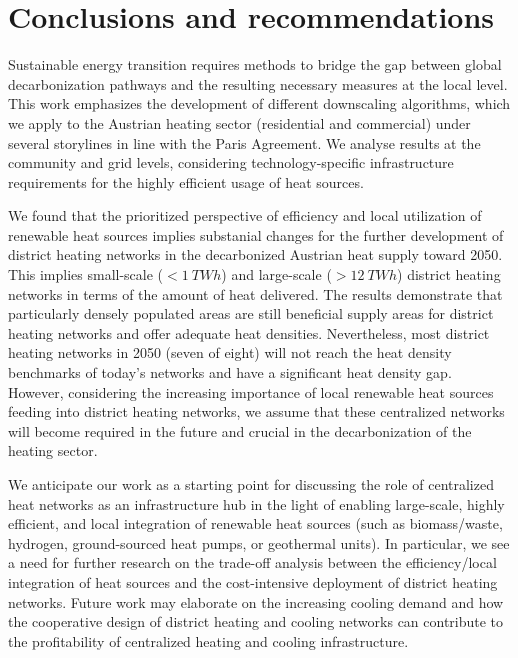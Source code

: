 \section{Conclusions and recommendations}\label{conclusions}
Sustainable energy transition requires methods to bridge the gap between global decarbonization pathways and the resulting necessary measures at the local level. This work emphasizes the development of different downscaling algorithms, which we apply to the Austrian heating sector (residential and commercial) under several storylines in line with the Paris Agreement. We analyse results at the community and grid levels, considering technology-specific infrastructure requirements for the highly efficient usage of heat sources.\vspace{0.3cm}

We found that the prioritized perspective of efficiency and local utilization of renewable heat sources implies substanial changes for the further development of district heating networks in the decarbonized Austrian heat supply toward 2050. This implies small-scale ($<\SI{1}{TWh}$) and large-scale ($>\SI{12}{TWh}$) district heating networks in terms of the amount of heat delivered. The results demonstrate that particularly densely populated areas are still beneficial supply areas for district heating networks and offer adequate heat densities. Nevertheless, most district heating networks in 2050 (seven of eight) will not reach the heat density benchmarks of today's networks and have a significant heat density gap. However, considering the increasing importance of local renewable heat sources feeding into district heating networks, we assume that these centralized networks will become required in the future and crucial in the decarbonization of the heating sector.\vspace{0.3cm}

We anticipate our work as a starting point for discussing the role of centralized heat networks as an infrastructure hub in the light of enabling large-scale, highly efficient, and local integration of renewable heat sources (such as biomass/waste, hydrogen, ground-sourced heat pumps, or geothermal units). In particular, we see a need for further research on the trade-off analysis between the efficiency/local integration of heat sources and the cost-intensive deployment of district heating networks. Future work may elaborate on the increasing cooling demand and how the cooperative design of district heating and cooling networks can contribute to the profitability of centralized heating and cooling infrastructure.